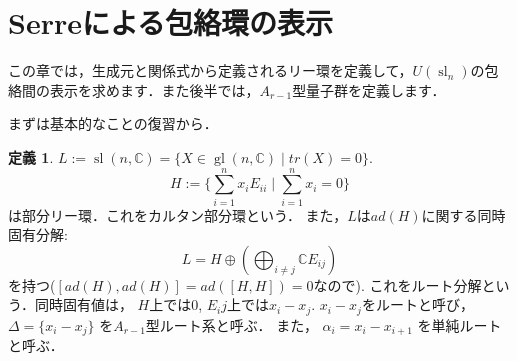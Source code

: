 \documentclass[dvipdfmx,autodetect-engine]{article}
\title{}
\author{}
\date{}
\theoremstyle{definition}
\newtheorem{Def}{定義}
\DeclareMathOperator{\gl}{gl}
\DeclareMathOperator{\sllie}{sl}
\begin{document}
    \section{Serreによる包絡環の表示}
    この章では，生成元と関係式から定義されるリー環を定義して，$U(\sllie_n)$の包絡間の表示を求めます．また後半では，$A_{r-1}$型量子群を定義します．
    
    まずは基本的なことの復習から．
    \begin{Def}
        $L := \sllie(n, \mathbb{C}) = \{X \in \gl(n, \mathbb{C}) \mid tr(X) = 0\}$.
        \[
            H := \{ \sum_{i = 1}^{n}x_iE_{ii} \mid \sum_{i = 1}^{n} x_i = 0\}
        \]
        は部分リー環．これをカルタン部分環という．
        また，$L$は$ad(H)$に関する同時固有分解:
        \[
            L = H \oplus (\bigoplus_{i \neq j}\mathbb{C}E_{ij})
        \]
        を持つ($[ad(H), ad(H)] = ad([H,H]) = 0$なので). これをルート分解という．同時固有値は，
        $H$上では$0$,
        $E_ij$上では$x_i - x_j$.
        $x_i - x_j$をルートと呼び，
        $\Delta = \{x_i - x_j\}$
        を$A_{r-1}$型ルート系と呼ぶ．
        また，
        $\alpha_i = x_i - x_{i+1}$
        を単純ルートと呼ぶ．
    \end{Def}
    
\end{document}
